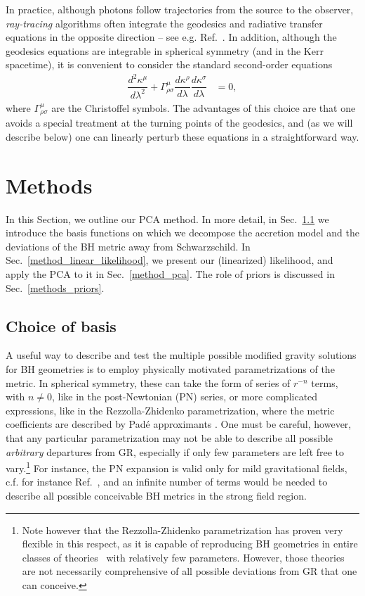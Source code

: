 \documentclass[%
nofootinbib,
 amsmath,amssymb,
 aps,
floatfix,
twocolumn
]{revtex4-2}
\begin{document}
In practice, although photons follow trajectories from the source to the observer, \emph{ray-tracing} algorithms often integrate the geodesics and radiative transfer equations in the opposite direction -- see e.g. Ref.~\cite{RezzollaYounsiBronzwaer:2018lde}. In addition, although the geodesics equations are integrable in spherical symmetry (and in the Kerr spacetime), it is convenient to consider the standard second-order equations 
%
\begin{align}\label{eq: GeodEqs}
    \dfrac{d^2 \kappa^\mu}{d \lambda^2 } + \Gamma^{\mu}_{\rho \sigma} \dfrac{d \kappa^\rho}{d \lambda}\dfrac{d \kappa^\sigma}{d \lambda} & = 0,
\end{align}
%
where \(\Gamma_{\rho \sigma}^{\mu}\) are the Christoffel symbols.  
%
The advantages of this choice are that one avoids a special treatment at the turning points of the geodesics, and (as we will describe below) one can linearly perturb these equations in a straightforward way. 

\section{Methods}\label{methods}

In this Section, we outline our PCA method. In more detail, in Sec.~\ref{methods_basis} we introduce the  basis functions on which we decompose
the accretion model and the deviations of the BH metric away from Schwarzschild. In Sec.~\ref{method_linear_likelihood}, 
we present our (linearized)
 likelihood,
 and apply the PCA to it in  Sec.~\ref{method_pca}. The role of  priors is discussed in Sec.~\ref{methods_priors}. 

\subsection{Choice of basis}\label{methods_basis}

A useful way to describe and test the multiple possible modified gravity solutions for BH geometries is to employ physically motivated parametrizations of the metric. In  spherical symmetry, these can take the form of series of \(r^{-n}\) terms, with \(n\neq 0\), like in the post-Newtonian (PN) series, or more complicated expressions, like in the Rezzolla-Zhidenko parametrization, where the metric coefficients are described by Pad\'e approximants \cite{PhysRevD.90.084009, Konoplya:2016jvv}.
%
One must be careful, however, that any particular parametrization may not be able to describe all possible {\it arbitrary} departures from GR, especially if only few  parameters are left free to vary.\footnote{Note however that the Rezzolla-Zhidenko parametrization has proven very flexible in this respect, as it is capable of reproducing BH geometries in entire classes of theories~\cite{konoplya2020general} with relatively few parameters. However, those theories are not necessarily comprehensive of all possible deviations from GR that one can conceive.}  
For instance, the PN expansion is valid only for mild gravitational fields, c.f. for instance Ref.~\cite{Volkel:2020xlc}, and an infinite number of terms would be needed to describe all possible conceivable BH metrics in the strong field region.
%
  
\end{document}
